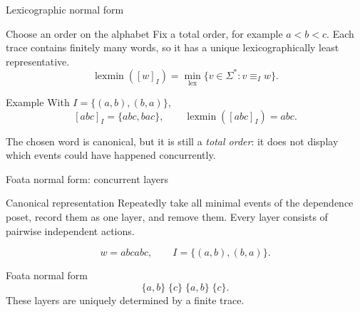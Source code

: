 \documentclass[t,11pt]{beamer}
\begin{document}
\begin{frame}{Lexicographic normal form}
  \begin{block}{Choose an order on the alphabet}
    Fix a total order, for example $a<b<c$. Each trace contains finitely many words, so it has a unique lexicographically least representative.
    \[
      \operatorname{lexmin}([w]_I)
      =\min_{\mathrm{lex}}\{v\in\Sigma^*:v\equiv_Iw\}.
    \]
  \end{block}
  \begin{block}{Example}
    With $I=\{(a,b),(b,a)\}$,
    \[
       [abc]_I=\{abc,bac\},\qquad
       \operatorname{lexmin}([abc]_I)=abc.
    \]
  \end{block}
  The chosen word is canonical, but it is still a \emph{total order}: it does not display which events could have happened concurrently.
\end{frame}

\begin{frame}{Foata normal form: concurrent layers}
  \begin{block}{Canonical representation}
    Repeatedly take all minimal events of the dependence poset, record them as one layer, and remove them. Every layer consists of pairwise independent actions.
  \end{block}
  \[
      w=abcabc,\qquad I=\{(a,b),(b,a)\}.
  \]
  \begin{center}
  \end{center}
  \begin{block}{Foata normal form}
    \[
       \{a,b\}\;\{c\}\;\{a,b\}\;\{c\}.
    \]
    These layers are uniquely determined by a finite trace.
  \end{block}
\end{frame}
\end{document}
